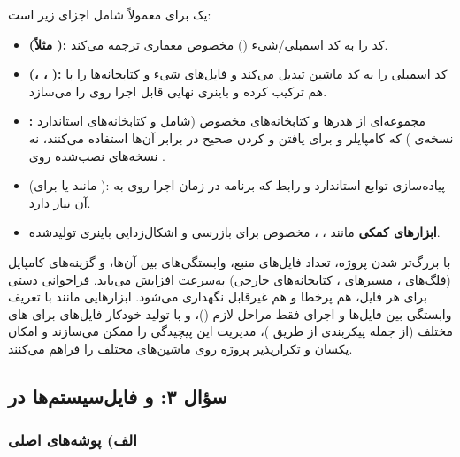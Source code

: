 یک  برای  معمولاً شامل اجزای زیر است:
\begin{itemize}
	\item \textbf{ (مثلاً ):} کد  را به کد اسمبلی/شیء () مخصوص معماری  ترجمه می‌کند.
	\item \textbf{ (، ، ):}  کد اسمبلی را به کد ماشین تبدیل می‌کند و  فایل‌های شیء و کتابخانه‌ها را با هم ترکیب کرده و باینری نهایی قابل اجرا روی  را می‌سازد.
	\item \textbf{:} مجموعه‌ای از هدرها و کتابخانه‌های مخصوص  (شامل  و کتابخانه‌های  استاندارد نسخه‌ی ) که کامپایلر و  برای یافتن و  کردن صحیح در برابر آن‌ها استفاده می‌کنند، نه نسخه‌های نصب‌شده روی .
	\item \textbf{} (مانند  یا  برای ): پیاده‌سازی توابع استاندارد و رابط  که برنامه در زمان اجرا روی  به آن نیاز دارد.
	\item \textbf{ابزارهای کمکی} مانند ، ،  مخصوص  برای بازرسی و اشکال‌زدایی باینری تولیدشده.
\end{itemize}

با بزرگ‌تر شدن پروژه، تعداد فایل‌های منبع، وابستگی‌های بین آن‌ها، و گزینه‌های کامپایل (فلگ‌های ، مسیرهای ، کتابخانه‌های خارجی) به‌سرعت افزایش می‌یابد. فراخوانی دستی  برای هر فایل، هم پرخطا و هم غیرقابل نگهداری می‌شود. ابزارهایی مانند  با تعریف وابستگی بین فایل‌ها و اجرای فقط مراحل لازم ()، و  با تولید خودکار فایل‌های  برای های مختلف (از جمله پیکربندی  از طریق )، مدیریت این پیچیدگی را ممکن می‌سازند و امکان  یکسان و تکرارپذیر پروژه روی ماشین‌های مختلف را فراهم می‌کنند.

\subsection{سؤال ۳:  و فایل‌سیستم‌ها در }

\subsubsection*{الف) پوشه‌های اصلی }

